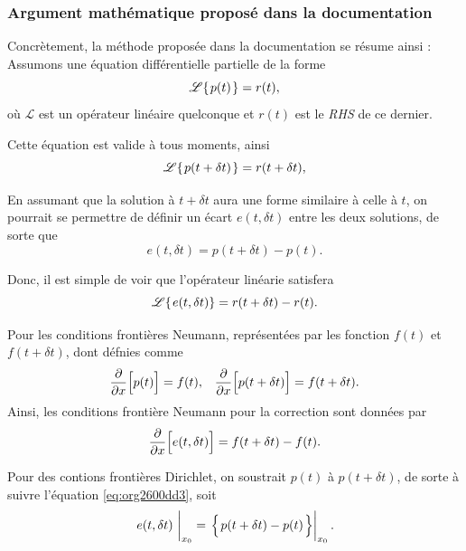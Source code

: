 \documentclass[10pt]{article}
\numberwithin{equation}{section}
\newcommand{\tall}{\vphantom{pA^{x^x}_p}}
\newcommand{\pt}{\hspace{1pt}} %
\begin{document}
\subsubsection{Argument mathématique proposé dans la documentation}
\label{sec:org678f04f}
Concrètement, la méthode proposée dans la documentation se résume ainsi :
Assumons une équation différentielle partielle de la forme
\begin{equation}
   \mathscr{L}\qty{\pt p(t)\pt} = r(t),
\end{equation}
où \(\mathscr{L}\) est un opérateur linéaire quelconque et \(r(t)\) est le \emph{RHS} de ce dernier.\bigskip

Cette équation est valide à tous moments, ainsi
\begin{equation}
   \mathscr{L}\qty{\pt p(t+\delta t)\pt} = r(t+\delta t),
\end{equation}

En assumant que la solution à \(t+\delta t\) aura une forme similaire à celle à \(t\), on pourrait se permettre de définir un écart \(e(t,\delta t)\) entre les deux solutions, de sorte que
\begin{equation}
\label{eq:org2600dd3}
   e(t,\delta t) = p(t+\delta t) - p(t).
\end{equation}

Donc, il est simple de voir que l'opérateur linéarie satisfera
\begin{equation}
   \mathscr{L}\qty{\pt e(t,\delta t)} = r(t+\delta t) - r(t).
\end{equation}

Pour les conditions frontières Neumann, représentées par les fonction \(f(t)\) et \(f(t+\delta t)\), dont défnies comme
\begin{align}
   && \pdv{}{x} \qty[ \tall p(t) ] = f(t), && \pdv{}{x} \qty[\tall p(t+\delta t)] = f(t+\delta t). &&
\end{align}
Ainsi, les conditions frontière Neumann pour la correction sont données par
\begin{equation}
   \pdv{}{x} \qty[ \tall e(t,\delta t) ]  = f(t+\delta t) - f(t).
\end{equation}

Pour des contions frontières Dirichlet, on soustrait \(p(t)\) à \(p(t+\delta t)\), de sorte à suivre l'équation \ref{eq:org2600dd3}, soit
\begin{equation}
   \eval{e(t,\delta t)\ }_{x_0} = \eval{ \qty{ \pt p(t+\delta t) - p(t)\pt \tall } }_{x_0}.
\end{equation}
\end{document}
